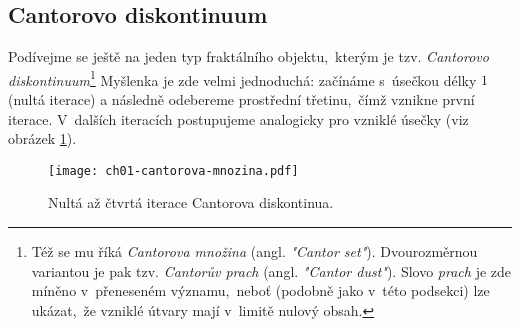 \subsection{Cantorovo diskontinuum}\label{subsec:cantorovo_diskontinuum}
Podívejme se ještě na jeden typ fraktálního objektu,~kterým je tzv. \emph{Cantorovo diskontinuum}\footnote{Též se mu říká \emph{Cantorova množina} (angl. \emph{"Cantor set"}). Dvourozměrnou variantou je pak tzv. \emph{Cantorův prach} (angl. \emph{"Cantor dust"}). Slovo \emph{prach} je zde míněno v~přeneseném významu,~neboť (podobně jako v~této podsekci) lze ukázat,~že vzniklé útvary mají v~limitě nulový obsah.} Myšlenka je zde velmi jednoduchá: začínáme s~úsečkou délky $1$ (nultá iterace) a následně odebereme prostřední třetinu,~čímž vznikne první iterace. V~dalších iteracích postupujeme analogicky pro vzniklé úsečky (viz obrázek \ref{fig:cantorovo_diskontinuum}).
\begin{figure}[h]
    \centering
    \texttt{[image: ch01-cantorova-mnozina.pdf]}
    \caption{Nultá až čtvrtá iterace Cantorova diskontinua.}
    \label{fig:cantorovo_diskontinuum}
\end{figure}


